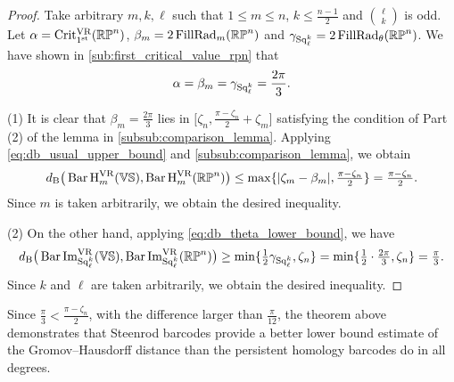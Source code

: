 \begin{proof}
	Take arbitrary $m, k, \ell$ such that $1 \leq m \leq n$, $k \leq \frac{n-1}{2}$ and $\binom{\ell}{k}$ is odd.
    Let $\alpha = \operatorname{Crit^{\mathrm{VR}}_{1^{\mathrm{st}}}}(\mathbb{RP}^n)$, $\beta_m = 2\operatorname{FillRad}_{m}(\mathbb{RP}^n)$ and $\gamma_{\operatorname{Sq}_\ell^k}= 2\operatorname{FillRad}_{\theta}(\mathbb{RP}^n)$.
    We have shown in \cref{sub:first_critical_value_rpn} that
	$$
	\alpha = \beta_m = \gamma_{\operatorname{Sq}_\ell^k} = \frac{2\pi}{3}.
	$$

    (1) It is clear that %
    $\beta_m = \tfrac{2\pi}{3}$ lies in $\big[\zeta_n, \tfrac{\pi - \zeta_n}{2}+\zeta_m\big]$ satisfying the condition of Part (2) of the lemma in \cref{subsub:comparison_lemma}.
	Applying \cref{eq:db_usual_upper_bound} and \cref{subsub:comparison_lemma}, we obtain
	\[d_{\mathrm{B}}\big(\operatorname{Bar} \operatorname{H}_{m}^{\mathrm{VR}} (\mathbb{V}\mathbb{S}), \operatorname{Bar} \operatorname{H}_{m}^{\mathrm{VR}} (\mathbb{RP}^n)\big)
    \leq \max\{|\zeta_m  - \beta_m |, \tfrac{\pi - \zeta_n}{2}\}
    = \tfrac{\pi - \zeta_n}{2}.\]
    Since $m$ is taken arbitrarily, we obtain the desired inequality.

	(2) On the other hand, applying \cref{eq:db_theta_lower_bound}, we have
	\[\db\big(\sqbarcl{k}{\ell}{\VS}, \sqbarcl{k}{\ell}{\rp^n}\big)
	\geq \min\{\tfrac{1}{2}\gamma_{\Sq_\ell^k}, \zeta_n\}
	= \min\{\tfrac{1}{2}\cdot\tfrac{2\pi}{3}, \zeta_n\}
	= \tfrac{\pi}{3}.%
    \]
    Since $k$ and $\ell$ are taken arbitrarily, we obtain the desired inequality.
\end{proof}

Since \(\tfrac{\pi}{3} < \tfrac{\pi - \zeta_n}{2}\), with the difference larger than \(\tfrac{\pi}{12}\), the theorem above demonstrates that Steenrod barcodes provide a better lower bound estimate of the Gromov--Hausdorff distance than the persistent homology barcodes do in all degrees.